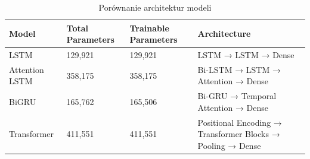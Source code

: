 \begin{table}
\caption{Porównanie architektur modeli}
\label{tab:model_comparison}
\begin{tabular}{llll}
\toprule
Model & Total Parameters & Trainable Parameters & Architecture \\
\midrule
LSTM & 129,921 & 129,921 & LSTM → LSTM → Dense \\
Attention LSTM & 358,175 & 358,175 & Bi-LSTM → LSTM → Attention → Dense \\
BiGRU & 165,762 & 165,506 & Bi-GRU → Temporal Attention → Dense \\
Transformer & 411,551 & 411,551 & Positional Encoding → Transformer Blocks → Pooling → Dense \\
\bottomrule
\end{tabular}
\end{table}
